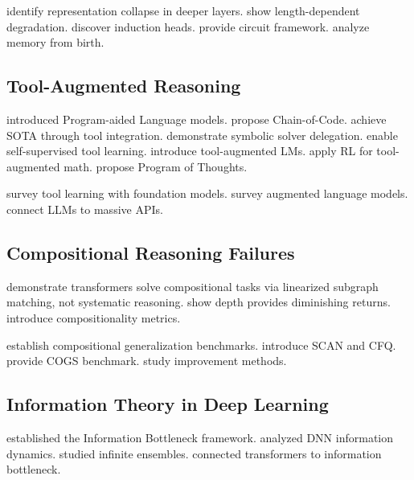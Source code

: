 \documentclass{article}
\theoremstyle{plain}
\theoremstyle{definition}
\theoremstyle{remark}
\begin{document}
\citet{aksenov2025representation} identify representation collapse in deeper layers. \citet{levy2024same} show length-dependent degradation. \citet{olsson2022context} discover induction heads. \citet{elhage2021mathematical} provide circuit framework. \citet{bietti2024birth} analyze memory from birth.

\subsection{Tool-Augmented Reasoning}

\citet{gao2023pal} introduced Program-aided Language models. \citet{li2023chaincode} propose Chain-of-Code. \citet{gou2024tora} achieve SOTA through tool integration. \citet{pan2024logiclm} demonstrate symbolic solver delegation. \citet{schick2023toolformer} enable self-supervised tool learning. \citet{parisi2022talm} introduce tool-augmented LMs. \citet{yang2024agentmath} apply RL for tool-augmented math. \citet{chen2023program} propose Program of Thoughts.

\citet{qin2024tool} survey tool learning with foundation models. \citet{mialon2023augmented} survey augmented language models. \citet{patil2023gorilla} connect LLMs to massive APIs.

\subsection{Compositional Reasoning Failures}

\citet{dziri2024faith} demonstrate transformers solve compositional tasks via linearized subgraph matching, not systematic reasoning. \citet{petty2024depth} show depth provides diminishing returns. \citet{press2023measuring} introduce compositionality metrics.

\citet{lake2018generalization} establish compositional generalization benchmarks. \citet{keysers2020measuring} introduce SCAN and CFQ. \citet{kim2020cogs} provide COGS benchmark. \citet{ontanon2022making} study improvement methods.

\subsection{Information Theory in Deep Learning}

\citet{tishby2015information} established the Information Bottleneck framework. \citet{shwartzziv2017opening} analyzed DNN information dynamics. \citet{goldfeld2020information} studied infinite ensembles. \citet{kirsch2024general} connected transformers to information bottleneck.
\end{document}
